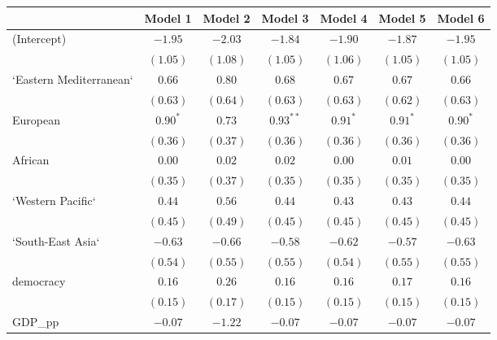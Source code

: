 
\begin{table}[!h]
\begin{center}
\begin{tabular}{l c c c c c c }
\toprule
 & Model 1 & Model 2 & Model 3 & Model 4 & Model 5 & Model 6 \\
\midrule
(Intercept)             & $-1.95$      & $-2.03$      & $-1.84$      & $-1.90$      & $-1.87$      & $-1.95$      \\
                        & $(1.05)$     & $(1.08)$     & $(1.05)$     & $(1.06)$     & $(1.05)$     & $(1.05)$     \\
`Eastern Mediterranean` & $0.66$       & $0.80$       & $0.68$       & $0.67$       & $0.67$       & $0.66$       \\
                        & $(0.63)$     & $(0.64)$     & $(0.63)$     & $(0.63)$     & $(0.62)$     & $(0.63)$     \\
European                & $0.90^{*}$   & $0.73$       & $0.93^{**}$  & $0.91^{*}$   & $0.91^{*}$   & $0.90^{*}$   \\
                        & $(0.36)$     & $(0.37)$     & $(0.36)$     & $(0.36)$     & $(0.36)$     & $(0.36)$     \\
African                 & $0.00$       & $0.02$       & $0.02$       & $0.00$       & $0.01$       & $0.00$       \\
                        & $(0.35)$     & $(0.37)$     & $(0.35)$     & $(0.35)$     & $(0.35)$     & $(0.35)$     \\
`Western Pacific`       & $0.44$       & $0.56$       & $0.44$       & $0.43$       & $0.43$       & $0.44$       \\
                        & $(0.45)$     & $(0.49)$     & $(0.45)$     & $(0.45)$     & $(0.45)$     & $(0.45)$     \\
`South-East Asia`       & $-0.63$      & $-0.66$      & $-0.58$      & $-0.62$      & $-0.57$      & $-0.63$      \\
                        & $(0.54)$     & $(0.55)$     & $(0.55)$     & $(0.54)$     & $(0.55)$     & $(0.55)$     \\
democracy               & $0.16$       & $0.26$       & $0.16$       & $0.16$       & $0.17$       & $0.16$       \\
                        & $(0.15)$     & $(0.17)$     & $(0.15)$     & $(0.15)$     & $(0.15)$     & $(0.15)$     \\
GDP\_pp                 & $-0.07$      & $-1.22$      & $-0.07$      & $-0.07$      & $-0.07$      & $-0.07$      \\

\end{tabular}
\end{center}
\end{table}
